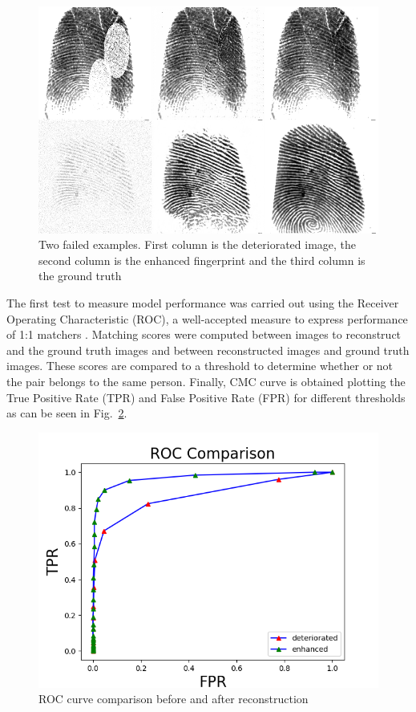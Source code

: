 \documentclass[a4paper,fleqn]{cas-dc}
\begin{document}
\begin{figure}[htbp]
\centerline{\includegraphics[scale=0.28]{figs/recons_failed.png}}
\caption{Two failed examples. First column is the deteriorated image, the second column is the enhanced fingerprint and the third column is the ground truth}
\label{fig8}
\end{figure}

The first test to measure model performance was carried out using the Receiver Operating Characteristic (ROC), a well-accepted measure to express performance of 1:1 matchers \cite{RROCCMC}. Matching scores were computed between images to reconstruct and the ground truth images and between reconstructed images and ground truth images. These scores are compared to a threshold to determine whether or not the pair belongs to the same person. Finally, CMC curve is obtained plotting the True Positive Rate (TPR) and False Positive Rate (FPR) for different thresholds as can be seen in Fig.~\ref{fig9}.

\begin{figure}[htbp]
\centerline{\includegraphics[scale=0.45]{figs/roc_comparison.png}}
\caption{ROC curve comparison before and after reconstruction}
\label{fig9}
\end{figure}
\end{document}
